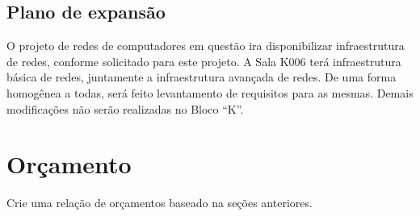 \documentclass[	DIV=calc,%
							paper=a4,%
							fontsize=12pt,%
							onecolumn]{scrartcl}	 					%
\begin{document}
\subsection{Plano de expansão}
O projeto de redes de computadores em questão ira disponibilizar infraestrutura de redes, conforme solicitado para este projeto. A Sala K006 terá infraestrutura básica de redes, juntamente a infraestrutura avançada de redes. De uma forma homogênea a todas, será feito levantamento de requisitos para as mesmas. Demais modificações não serão realizadas no Bloco “K”.

\section{Orçamento}
Crie uma relação de orçamentos baseado na seções anteriores.
\end{document}
